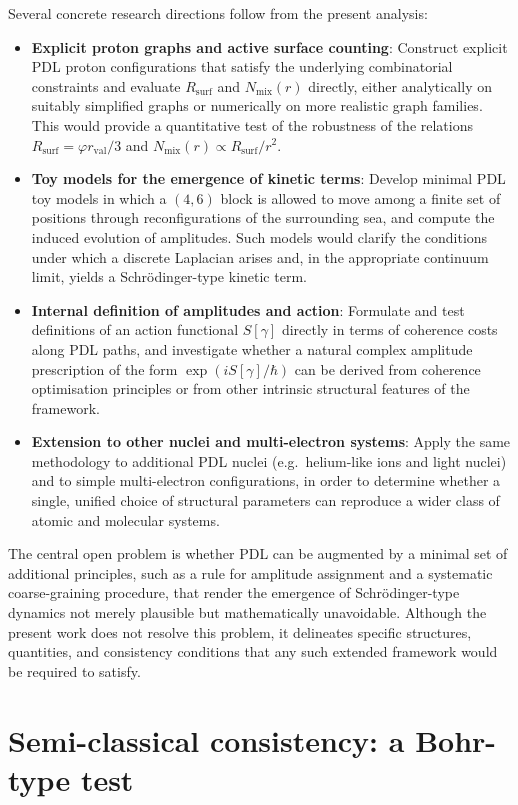\documentclass[11pt,a4paper]{article}
\begin{document}
Several concrete research directions follow from the present analysis:
\begin{itemize}
\item \textbf{Explicit proton graphs and active surface counting}: Construct explicit PDL proton configurations that satisfy the underlying combinatorial constraints and evaluate $R_{\mathrm{surf}}$ and $N_{\mathrm{mix}}(r)$ directly, either analytically on suitably simplified graphs or numerically on more realistic graph families. This would provide a quantitative test of the robustness of the relations $R_{\mathrm{surf}}=\varphi r_{\mathrm{val}}/3$ and $N_{\mathrm{mix}}(r)\propto R_{\mathrm{surf}}/r^{2}$.
\item \textbf{Toy models for the emergence of kinetic terms}: Develop minimal PDL toy models in which a $(4,6)$ block is allowed to move among a finite set of positions through reconfigurations of the surrounding sea, and compute the induced evolution of amplitudes. Such models would clarify the conditions under which a discrete Laplacian arises and, in the appropriate continuum limit, yields a Schr\"odinger-type kinetic term.
\item \textbf{Internal definition of amplitudes and action}: Formulate and test definitions of an action functional $S[\gamma]$ directly in terms of coherence costs along PDL paths, and investigate whether a natural complex amplitude prescription of the form $\exp(iS[\gamma]/\hbar)$ can be derived from coherence optimisation principles or from other intrinsic structural features of the framework.
\item \textbf{Extension to other nuclei and multi-electron systems}: Apply the same methodology to additional PDL nuclei (e.g.\ helium-like ions and light nuclei) and to simple multi-electron configurations, in order to determine whether a single, unified choice of structural parameters can reproduce a wider class of atomic and molecular systems.
\end{itemize}
The central open problem is whether PDL can be augmented by a minimal set of additional principles, such as a rule for amplitude assignment and a systematic coarse-graining procedure, that render the emergence of Schr\"odinger-type dynamics not merely plausible but mathematically unavoidable. Although the present work does not resolve this problem, it delineates specific structures, quantities, and consistency conditions that any such extended framework would be required to satisfy.

\section{Semi-classical consistency: a Bohr-type test}
\label{sec:BohrTest}
\end{document}
